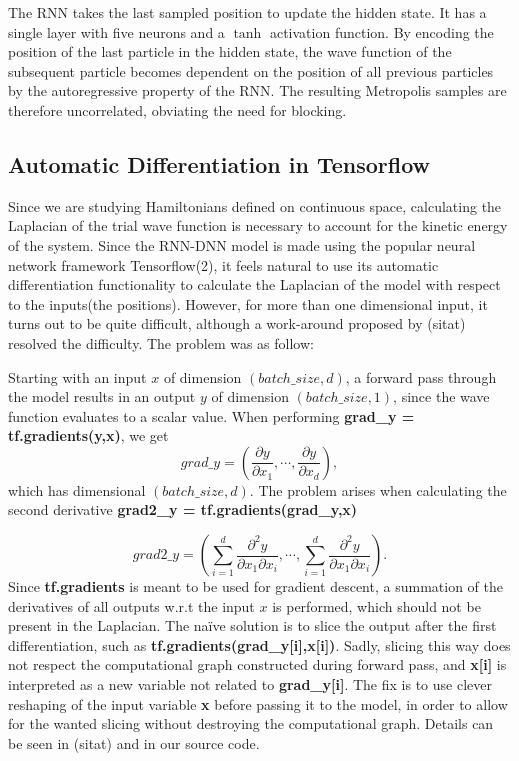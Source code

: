 The RNN takes the last sampled position to update the hidden state. It has a
single layer with five neurons and a \(\tanh\) activation function. 
By encoding the position of the last particle in the hidden state, the wave
function of the subsequent particle becomes dependent on the position of all
previous particles by the autoregressive property of the RNN. The resulting
Metropolis samples are therefore uncorrelated, obviating the need for blocking.


\subsection{Automatic Differentiation in Tensorflow}
Since we are studying Hamiltonians defined on continuous space, calculating the
Laplacian of the trial wave function is necessary to account for the kinetic
energy of the system. Since the RNN-DNN model is made using the popular neural
network framework Tensorflow(2), it feels natural to use its automatic
differentiation functionality to calculate the Laplacian of the model with
respect to the inputs(the positions). However, for more than one dimensional
input, it turns out to be quite difficult, although a work-around proposed by
(sitat) resolved the difficulty. The problem was as follow:  

Starting with an input $x$ of dimension $(batch\_size, d)$, a forward pass through the model results in an output $y$ of dimension $(batch\_size, 1)$, since the wave function evaluates to a scalar value. When performing \textbf{grad\_y = tf.gradients(y,x)}, we get 
\begin{equation*}
	grad\_y = \left(\frac{\partial y}{\partial x_1}, \cdots, \frac{\partial y}{\partial x_d}\right),
\end{equation*}
which has dimensional $(batch\_size, d)$. The problem arises when calculating the second derivative \textbf{grad2\_y = tf.gradients(grad\_y,x)}

\begin{equation*}
	grad2\_y = \left(\sum_{i=1}^{d}\frac{\partial^2 y}{\partial x_1 \partial x_i}, \cdots, \sum_{i=1}^{d}\frac{\partial^2 y}{\partial x_1 \partial x_i}\right).
\end{equation*}
Since \textbf{tf.gradients} is meant to be used for gradient descent, a summation of the derivatives of all outputs w.r.t the input $x$ is performed, which should not be present in the Laplacian.
The naïve solution is to slice the output after the first differentiation, such as\newline 
\textbf{tf.gradients(grad\_y[i],x[i])}. Sadly, slicing this way does not respect the computational graph constructed during forward pass, and \textbf{x[i]} is interpreted as a new variable not related to \textbf{grad\_y[i]}. The fix is to use clever reshaping of the input variable \textbf{x} before passing it to the model, in order to allow for the wanted slicing without destroying the computational graph. Details can be seen in (sitat) and in our source code. 

